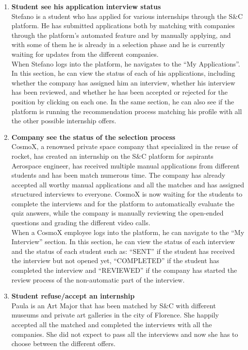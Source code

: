 \begin{enumerate}
    \item \textbf{\textcolor{titleColor}{Student see his application  interview status}}\\
        Stefano is a student who has applied for various internships through the S\&C platform. He has submitted applications both by matching with companies through the platform's automated feature and by manually applying, and with some of them he is already in a selection phase and he is currently waiting for updates from the different companies.\\
        When Stefano logs into the platform, he navigates to the “My Applications”. In this section, he can view the status of each of his applications, including whether the company has assigned him an interview, whether his interview has been reviewed, and whether he has been accepted or rejected for the position by clicking on each one. In the same section, he can also see if the platform is running the recommendation process matching his profile with all the other possible internship offers.
    \item \textbf{\textcolor{titleColor}{Company see the status of the selection process}}\\
        CosmoX, a renowned private space company that specialized in the reuse of rocket, has created an internship on the S\&C platform for aspirants Aerospace engineer, has received multiple manual applications from different students and has been match numerous time. The company has already accepted all worthy manual applications and all the matches and has assigned structured interviews to everyone.
        CosmoX is now waiting for the students to complete the interviews and for the platform to automatically evaluate the quiz answers,  while the company is manually reviewing the open-ended questions and grading the different video calls.\\
        When a CosmoX employee logs into the platform, he can navigate to the “My Interview” section. In this section, he can view the status of each interview and the status of each student such as: “SENT” if the student has received the interview but not opened yet, “COMPLETED” if the student has completed the interview and “REVIEWED” if the company has started the review process of the non-automatic part of the interview.
    \item \textbf{\textcolor{titleColor}{Student refuse/accept an internship}}\\
    Paula is an Art Major that has been matched by S\&C with different museums and private art galleries in the city of Florence. She happily accepted all the matched and completed the interviews with all the companies. She did not expect to pass all the interviews and now she has to choose between the different offers.\\

\end{enumerate}
